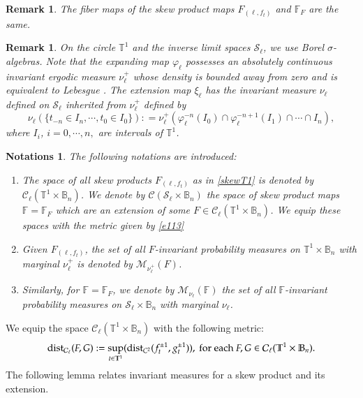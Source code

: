 \documentclass[11pt,reqno]{amsart}
\theoremstyle{plain}
\newtheorem{remark}[theorem]{Remark}
\newtheorem{notations}[theorem]{Notations}
\newtheorem*{theorem A}{Theorem A}
\newtheorem*{theorem B}{Theorem B}
\newtheorem*{theorem C}{Theorem C}
\newtheorem*{theorem 1}{Theorem 1}
\newtheorem*{theorem 2}{Theorem 2}
\newtheorem*{theorem 3}{Theorem 3}
\numberwithin{equation}{section}
\begin{document}
\begin{remark}\label{rem90}
The fiber maps of the skew product maps $F_{(\ell, f_t)}$ and $\mathbb{F}_{F}$ are the same.
\end{remark}

\begin{remark}\label{circ-measure}
On the circle $\mathbb{T}^1$ and the inverse limit spaces $\mathcal{S}_\ell$, we use Borel $\sigma$-algebras.
Note that the expanding map $\varphi_\ell$ possesses an absolutely continuous invariant ergodic measure $\nu_\ell^+$ whose density is bounded away from zero and is equivalent to Lebesgue \cite{krzyzewski2004invariant, mane2012ergodic}.
The extension map $\xi_\ell$ has the invariant measure $\nu_\ell$ defined on $\mathcal{S}_\ell$ inherited from $\nu_\ell^+$ defined by
\begin{equation*}
  \nu_\ell (\{t_{-n}\in I_n, \cdots, t_0 \in I_0\}) : =\nu_\ell^+(\varphi_\ell^{-n}(I_0) \cap \varphi_\ell^{-n+1}(I_1)\cap \cdots \cap I_n),
\end{equation*}
where $I_i$, $i=0, \cdots, n,$ are intervals of $\mathbb{T}^1$.
\end{remark}

\begin{notations}\label{n.espacesofmaps}
The following notations are introduced:
\begin{enumerate}
  \item The space of all skew products $F_{(\ell, f_t)}$ as in \eqref{skewT1} is denoted by $\mathcal{C}_\ell(\mathbb{T}^1\times \mathbb{B}_n)$.
  We denote by $\mathcal{C} (\mathcal{S}_\ell \times \mathbb{B}_n)$ the space of skew product maps $\mathbb{F}= \mathbb{F}_{F}$ which are an extension of some $F\in \mathcal{C}_\ell(\mathbb{T}^1\times \mathbb{B}_n)$.
  We equip these spaces with the metric given by \eqref{e113}
  \item Given $F_{(\ell, f_t)}$, the set of all $F$-invariant probability measures on $\mathbb{T}^1\times \mathbb{B}_n$ with marginal $\nu_\ell^+$ is denoted by $\mathcal{M}_{\nu_\ell^+}(F)$.
  \item Similarly, for $\mathbb{F}= \mathbb{F}_{F}$, we denote by $\mathcal{M}_{\nu_\ell}(\mathbb{F})$ the set of all $\mathbb{F}$-invariant probability measures on $\mathcal{S}_\ell\times \mathbb{B}_n$ with marginal $\nu_\ell$.
\end{enumerate}
\end{notations}

We equip the space $\mathcal{C}_\ell(\mathbb{T}^1\times \mathbb{B}_n)$ with the following metric:
\begin{equation}\label{e113}
  \textnormal{dist}_{ \mathcal{C}_{\ell}}(F,G):=\sup_{t \in \mathbb{T}^1}(\textnormal{dist}_{C^2}(f_t^{\pm 1} , g_t^{\pm 1})), \ \textnormal{for each } F,G \in \mathcal{C}_\ell(\mathbb{T}^1\times \mathbb{B}_n).
\end{equation}
The following lemma \cite{crauel1990extremal} relates invariant measures for a skew product and its extension.
\end{document}
